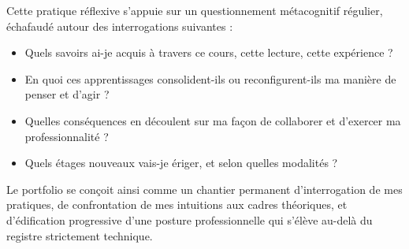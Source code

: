 Cette pratique réflexive s'appuie sur un questionnement métacognitif régulier, échafaudé autour des interrogations suivantes :

\begin{itemize}
    \item Quels savoirs ai-je acquis à travers ce cours, cette lecture, cette expérience ?
    \item En quoi ces apprentissages consolident-ils ou reconfigurent-ils ma manière de penser et d'agir ?
    \item Quelles conséquences en découlent sur ma façon de collaborer et d'exercer ma professionnalité ?
    \item Quels étages nouveaux vais-je ériger, et selon quelles modalités ?
\end{itemize}

Le portfolio se conçoit ainsi comme un chantier permanent d'interrogation de mes pratiques, de confrontation de mes intuitions aux cadres théoriques, et d'édification progressive d'une posture professionnelle qui s'élève au-delà du registre strictement technique.

\clearpage
\ClearShipoutPictureBG
